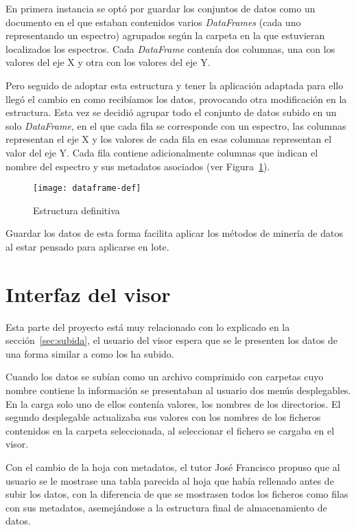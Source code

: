 En primera instancia se optó por guardar los conjuntos de datos como un
documento en el que estaban contenidos varios \textit{DataFrames} (cada uno
representando un espectro) agrupados según la carpeta en la que estuvieran
localizados los espectros. Cada \textit{DataFrame} contenía dos columnas, una
con los valores del eje X y otra con los valores del eje Y.

Pero seguido de adoptar esta estructura y tener la aplicación adaptada para ello
llegó el cambio en como recibíamos los datos, provocando otra modificación en la
estructura. Esta vez se decidió agrupar todo el conjunto de datos subido en un
solo \textit{DataFrame}, en el que cada fila se corresponde con un espectro, las
columnas representan el eje X y los valores de cada fila en esas columnas
representan el valor del eje Y. Cada fila contiene adicionalmente columnas que
indican el nombre del espectro y sus metadatos asociados (ver
Figura~\ref{fig:dataframe-def}).

\begin{figure}[!h]
	\centering
	\texttt{[image: dataframe-def]}
	\caption{Estructura definitiva}\label{fig:dataframe-def}
\end{figure}

Guardar los datos de esta forma facilita aplicar los métodos de minería de datos
al estar pensado para aplicarse en lote.

\section{Interfaz del visor}

Esta parte del proyecto está muy relacionado con lo explicado en la
sección~\ref{sec:subida}, el usuario del visor espera que se le presenten los
datos de una forma similar a como los ha subido.

Cuando los datos se subían como un archivo comprimido con carpetas cuyo nombre
contiene la información se presentaban al usuario dos menús desplegables. En la
carga solo uno de ellos contenía valores, los nombres de los directorios. El
segundo desplegable actualizaba sus valores con los nombres de los ficheros
contenidos en la carpeta seleccionada, al seleccionar el fichero se cargaba en
el visor.

Con el cambio de la hoja con metadatos, el tutor José Francisco propuso que al
usuario se le mostrase una tabla parecida al hoja que había rellenado antes de
subir los datos, con la diferencia de que se mostrasen todos los ficheros como
filas con sus metadatos, asemejándose a la estructura final de almacenamiento de
datos.

